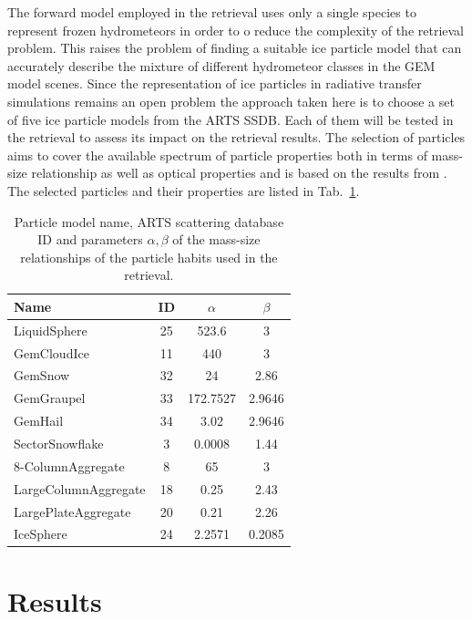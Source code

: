 \documentclass[journal abbreviation, manuscript]{copernicus}
\begin{document}
The forward model employed in the retrieval uses only a single species to
represent frozen hydrometeors in order to o reduce the complexity of the
retrieval problem. This raises the problem of finding a suitable ice particle
model that can accurately describe the mixture of different hydrometeor classes
in the GEM model scenes. Since the representation of ice particles in radiative
transfer simulations remains an open problem the approach taken here is to
choose a set of five ice particle models from the ARTS SSDB. Each of them will
be tested in the retrieval to assess its impact on the retrieval results. The
selection of particles aims to cover the available spectrum of particle
properties both in terms of mass-size relationship as well as optical properties
and is based on the results from \citet{ekelund19}. The selected particles and
their properties are listed in Tab.~\ref{tab:particle_properties}.

\begin{table}
  \centering
  \caption{Particle model name, ARTS scattering database ID and parameters
    $\alpha, \beta$ of the mass-size relationships of the particle habits used
    in the retrieval.}
  \begin{tabular}{l|c|c|c}
    Name & ID & $\alpha$ & $\beta$ \\
    \hline
    LiquidSphere & 25 & 523.6 & 3 \\
    GemCloudIce          & 11  & 440      & 3 \\
    GemSnow              & 32  & 24  & 2.86 \\
    GemGraupel           & 33  & 172.7527 & 2.9646 \\
    GemHail              & 34  & 3.02 & 2.9646 \\
    \hline
    SectorSnowflake      &  3 & 0.0008   & 1.44 \\
    8-ColumnAggregate    &  8   & 65       & 3 \\
    LargeColumnAggregate &  18 & 0.25     & 2.43 \\
    LargePlateAggregate  &  20 & 0.21     & 2.26 \\
    IceSphere            &  24 & 2.2571   & 0.2085 \\
  \end{tabular}
  \label{tab:particle_properties}
\end{table}



\section{Results}
\label{sec:results}
\end{document}
